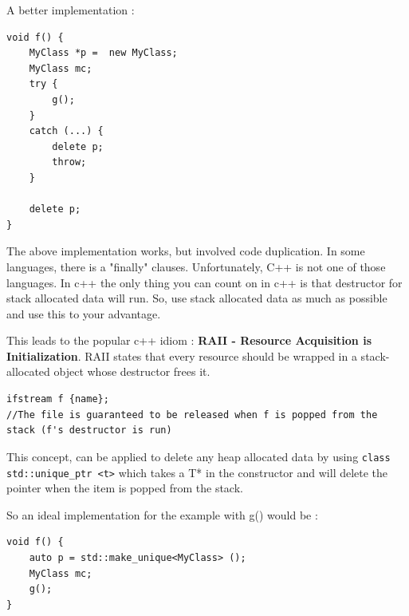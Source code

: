 \documentclass{article}
\begin{document}
A better implementation : 
\begin{lstlisting}
void f() {
	MyClass *p =  new MyClass;
	MyClass mc;
	try {
		g();
	}
	catch (...) {
		delete p;
		throw; 
	}
	
	delete p;
}
\end{lstlisting}

The above implementation works, but involved code duplication. In some languages, there is a "finally" clauses. Unfortunately, C++ is not one of those languages.  In c++ the only thing you can count on in c++ is that destructor for stack allocated data will run. So, use stack allocated data as much as possible and use this to your advantage. 

This leads to the popular c++ idiom : \textbf{RAII - Resource Acquisition is Initialization}. RAII states that every resource should be wrapped in a stack-allocated object whose destructor frees it. 

\begin{lstlisting}
ifstream f {name}; 
//The file is guaranteed to be released when f is popped from the stack (f's destructor is run)
\end{lstlisting}

This concept, can be applied to delete any heap allocated data by using \verb|class std::unique_ptr <t>| which takes a T* in the constructor and will delete the pointer when the item is popped from the stack.

So an ideal implementation for the example with g() would be : 
\begin{lstlisting}
void f() { 
	auto p = std::make_unique<MyClass> ();
	MyClass mc;
	g();
}	
\end{lstlisting}
\end{document}
